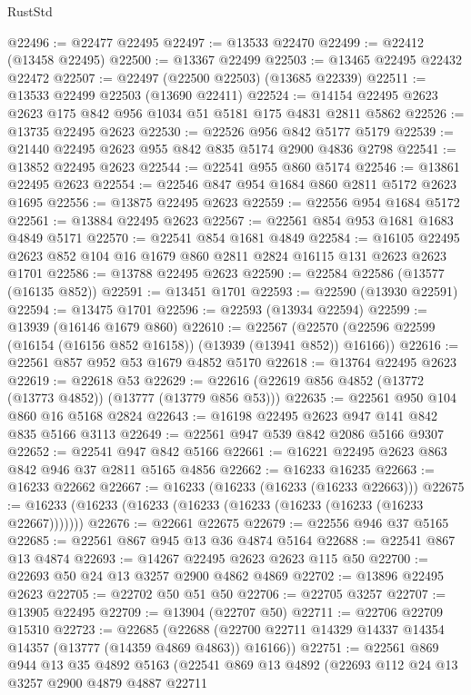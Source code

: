 \begin{lexlean}{RustStd}
\begin{coremodule}
@22496 := @22477 @22495
@22497 := @13533 @22470
@22499 := @22412 (@13458 @22495)
@22500 := @13367 @22499
@22503 := @13465 @22495 @22432 @22472
@22507 := @22497 (@22500 @22503) (@13685 @22339)
@22511 := @13533 @22499 @22503 (@13690 @22411)
@22524 := @14154 @22495 @2623 @2623 @175 @842 @956 @1034 @51 @5181 @175 @4831 @2811 @5862
@22526 := @13735 @22495 @2623
@22530 := @22526 @956 @842 @5177 @5179
@22539 := @21440 @22495 @2623 @955 @842 @835 @5174 @2900 @4836 @2798
@22541 := @13852 @22495 @2623
@22544 := @22541 @955 @860 @5174
@22546 := @13861 @22495 @2623
@22554 := @22546 @847 @954 @1684 @860 @2811 @5172 @2623 @1695
@22556 := @13875 @22495 @2623
@22559 := @22556 @954 @1684 @5172
@22561 := @13884 @22495 @2623
@22567 := @22561 @854 @953 @1681 @1683 @4849 @5171
@22570 := @22541 @854 @1681 @4849
@22584 := @16105 @22495 @2623 @852 @104 @16 @1679 @860 @2811 @2824 @16115 @131 @2623 @2623 @1701
@22586 := @13788 @22495 @2623
@22590 := @22584 @22586 (@13577 (@16135 @852))
@22591 := @13451 @1701
@22593 := @22590 (@13930 @22591)
@22594 := @13475 @1701
@22596 := @22593 (@13934 @22594)
@22599 := @13939 (@16146 @1679 @860)
@22610 := @22567
    (@22570 (@22596 @22599 (@16154 (@16156 @852 @16158)) (@13939 (@13941 @852)) @16166))
@22616 := @22561 @857 @952 @53 @1679 @4852 @5170
@22618 := @13764 @22495 @2623
@22619 := @22618 @53
@22629 := @22616 (@22619 @856 @4852 (@13772 (@13773 @4852)) (@13777 (@13779 @856 @53)))
@22635 := @22561 @950 @104 @860 @16 @5168 @2824
@22643 := @16198 @22495 @2623 @947 @141 @842 @835 @5166 @3113
@22649 := @22561 @947 @539 @842 @2086 @5166 @9307
@22652 := @22541 @947 @842 @5166
@22661 := @16221 @22495 @2623 @863 @842 @946 @37 @2811 @5165 @4856
@22662 := @16233 @16235
@22663 := @16233 @22662
@22667 := @16233 (@16233 (@16233 (@16233 @22663)))
@22675 := @16233 (@16233 (@16233 (@16233 (@16233 (@16233 (@16233 (@16233 @22667)))))))
@22676 := @22661 @22675
@22679 := @22556 @946 @37 @5165
@22685 := @22561 @867 @945 @13 @36 @4874 @5164
@22688 := @22541 @867 @13 @4874
@22693 := @14267 @22495 @2623 @2623 @115 @50
@22700 := @22693 @50 @24 @13 @3257 @2900 @4862 @4869
@22702 := @13896 @22495 @2623
@22705 := @22702 @50 @51 @50
@22706 := @22705 @3257
@22707 := @13905 @22495
@22709 := @13904 (@22707 @50)
@22711 := @22706 @22709 @15310
@22723 := @22685
    (@22688 (@22700 @22711 @14329 @14337 @14354 @14357 (@13777 (@14359 @4869 @4863)) @16166))
@22751 := @22561
    @869
    @944
    @13
    @35
    @4892
    @5163
    (@22541
      @869
      @13
      @4892
      (@22693
        @112
        @24
        @13
        @3257
        @2900
        @4879
        @4887
        @22711

\end{coremodule}
\end{lexlean}
